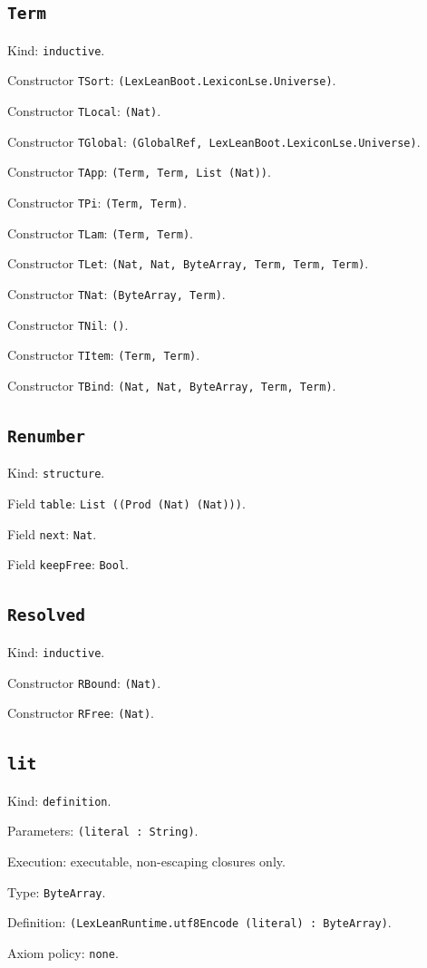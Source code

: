 \documentclass[11pt]{article}
\begin{document}
\subsection*{\texttt{Term}}
\noindent Kind: \texttt{inductive}.\par
\noindent Constructor \texttt{TSort}: \texttt{(LexLeanBoot.LexiconLse.Universe)}.\par
\noindent Constructor \texttt{TLocal}: \texttt{(Nat)}.\par
\noindent Constructor \texttt{TGlobal}: \texttt{(GlobalRef, LexLeanBoot.LexiconLse.Universe)}.\par
\noindent Constructor \texttt{TApp}: \texttt{(Term, Term, List (Nat))}.\par
\noindent Constructor \texttt{TPi}: \texttt{(Term, Term)}.\par
\noindent Constructor \texttt{TLam}: \texttt{(Term, Term)}.\par
\noindent Constructor \texttt{TLet}: \texttt{(Nat, Nat, ByteArray, Term, Term, Term)}.\par
\noindent Constructor \texttt{TNat}: \texttt{(ByteArray, Term)}.\par
\noindent Constructor \texttt{TNil}: \texttt{()}.\par
\noindent Constructor \texttt{TItem}: \texttt{(Term, Term)}.\par
\noindent Constructor \texttt{TBind}: \texttt{(Nat, Nat, ByteArray, Term, Term)}.\par
\subsection*{\texttt{Renumber}}
\noindent Kind: \texttt{structure}.\par
\noindent Field \texttt{table}: \texttt{List ((Prod (Nat) (Nat)))}.\par
\noindent Field \texttt{next}: \texttt{Nat}.\par
\noindent Field \texttt{keepFree}: \texttt{Bool}.\par
\subsection*{\texttt{Resolved}}
\noindent Kind: \texttt{inductive}.\par
\noindent Constructor \texttt{RBound}: \texttt{(Nat)}.\par
\noindent Constructor \texttt{RFree}: \texttt{(Nat)}.\par
\subsection*{\texttt{lit}}
\noindent Kind: \texttt{definition}.\par
\noindent Parameters: \texttt{(literal : String)}.\par
\noindent Execution: executable, non-escaping closures only.\par
\noindent Type: \texttt{ByteArray}.\par
\noindent Definition: \texttt{(LexLeanRuntime.utf8Encode (literal) : ByteArray)}.\par
\noindent Axiom policy: \texttt{none}.\par
\end{document}

